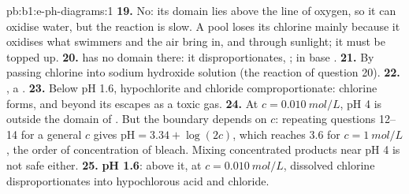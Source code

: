 \begin{solution}{pb:b1:e-ph-diagrams:1}
\textbf{19.} No: its domain lies above the line of oxygen, so it can
oxidise water, but the reaction is slow. A pool loses its chlorine mainly
because it oxidises what swimmers and the air bring in, and through
sunlight; it must be topped up.
\textbf{20.}  has no domain there: it disproportionates,
; in base
.
\textbf{21.} By passing chlorine into sodium hydroxide solution (the
reaction of question 20).
\textbf{22.} , a .
\textbf{23.} Below pH 1.6, hypochlorite and chloride comproportionate: chlorine forms,
and beyond its  escapes as a toxic gas.
\textbf{24.} At $c = \qty{0.010}{mol/L}$, pH 4 is outside the domain of
. But the boundary depends on $c$: repeating questions 12--14 for
a general $c$ gives $\mathrm{pH} = 3.34 + \log(2c)$, which reaches 3.6 for
$c = \qty{1}{mol/L}$, the order of concentration of bleach. Mixing
concentrated products near pH 4 is not safe either.
\textbf{25.} \textbf{pH 1.6}: above it, at $c = \qty{0.010}{mol/L}$,
dissolved chlorine disproportionates into hypochlorous acid and chloride.
\end{solution}
